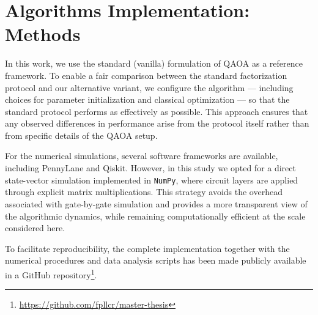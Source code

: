 
\section{Algorithms Implementation: Methods}
\label{Section:Methods}

In this work, we use the standard (vanilla) formulation of QAOA as a reference framework. To enable a fair comparison between the standard factorization protocol and our alternative variant, we configure the algorithm --- including choices for parameter initialization and classical optimization --- so that the standard protocol performs as effectively as possible. This approach ensures that any observed differences in performance arise from the protocol itself rather than from specific details of the QAOA setup.

For the numerical simulations, several software frameworks are available, including PennyLane and Qiskit. However, in this study we opted for a direct state-vector simulation implemented in \texttt{NumPy}, where circuit layers are applied through explicit matrix multiplications. This strategy avoids the overhead associated with gate-by-gate simulation and provides a more transparent view of the algorithmic dynamics, while remaining computationally efficient at the scale considered here.

To facilitate reproducibility, the complete implementation together with the numerical procedures and data analysis scripts has been made publicly available in a GitHub repository\footnote{\url{https://github.com/fpllcr/master-thesis}}.
